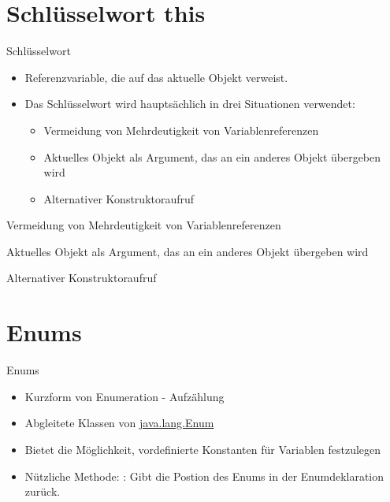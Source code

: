 \documentclass{../tuda-beamer}
\begin{document}
    \section{Schlüsselwort this}
    \begin{frame}{Schlüsselwort }
        \begin{itemize}
            \item Referenzvariable, die auf das aktuelle Objekt verweist.
            \item Das Schlüsselwort  wird hauptsächlich in drei Situationen
            verwendet:
            \begin{itemize}
                \item Vermeidung von Mehrdeutigkeit von Variablenreferenzen
                \item Aktuelles Objekt als Argument, das an ein anderes Objekt übergeben wird
                \item Alternativer Konstruktoraufruf
            \end{itemize}
        \end{itemize}
    \end{frame}

    \begin{frame}{Vermeidung von Mehrdeutigkeit von Variablenreferenzen}
        
    \end{frame}

    \begin{frame}{Aktuelles Objekt als Argument, das an ein anderes Objekt übergeben wird}
        
    \end{frame}

    \begin{frame}[c]{Alternativer Konstruktoraufruf}
        
    \end{frame}


    \section{Enums}
    \begin{frame}{Enums}
        \begin{itemize}
            \item Kurzform von Enumeration - Aufzählung
            \item Abgleitete Klassen von \href{https://docs.oracle.com/en/java/javase/11/docs/api/java.base/java/lang/Enum.html}{java.lang.Enum}
            \item Bietet die Möglichkeit, vordefinierte Konstanten für Variablen festzulegen
            \item Nützliche Methode: : Gibt die Postion des Enums in der
            Enumdeklaration zurück.
        \end{itemize}
    \end{frame}
\end{document}

